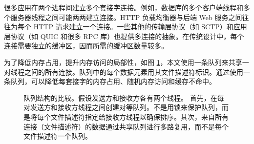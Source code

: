 很多应用在两个进程间建立多个套接字连接。例如，数据库的多个客户端线程和多个服务器线程之间可能两两建立连接。HTTP 负载均衡器与后端 Web 服务之间往往为每个 HTTP 请求建立一个连接。一些其他的传输层协议（如 SCTP）和应用层协议（如 QUIC 和很多 RPC 库）也提供多连接的抽象。在传统设计中，每个连接需要独立的缓冲区，因而所需的缓冲区数量较多。

为了降低内存占用，提升内存访问的局部性，如图 \ref{socksdirect:fig:fork-rdwr}，本文使用一条队列来共享一对线程之间的所有连接。队列中的每个数据元素用其文件描述符标识。通过使用一条队列，可以降低每套接字的内存占用、随机内存访问和缓存不命中。



\begin{figure}[htbp]
	\centering

	\caption{队列结构的比较。假设发送方和接收方各有两个线程。 首先，在每对发送方和接收方线程之间创建对等队列。不是用锁来保护队列，而是将每个文件描述符指定给接收方线程以确保排序。其次，来自所有连接（文件描述符）的数据通过共享队列进行多路复用，而不是每个文件描述符一个队列。}
	\label{socksdirect:fig:fork-rdwr}
\end{figure}

